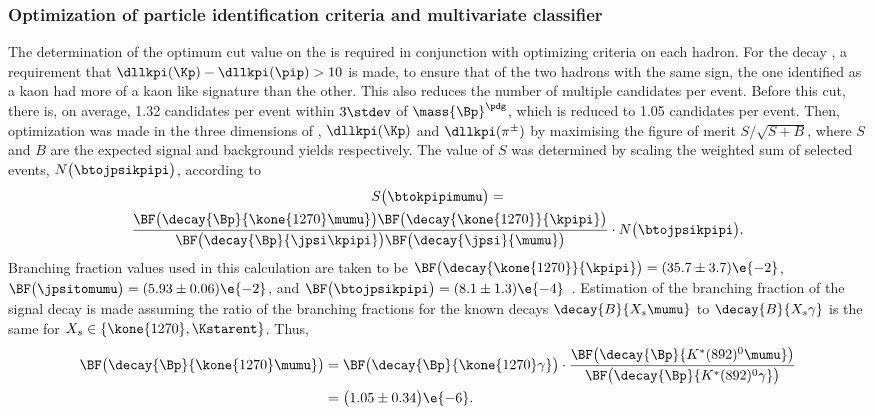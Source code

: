\subsubsection{Optimization of particle identification criteria and multivariate classifier}
\label{sssec:opt:kpipi}
The determination of the optimum cut value on the \BDT is required in conjunction with optimizing
\pid criteria on each hadron.
For the decay \btokpipimumu, a requirement that $\dllkpi(\Kp)-\dllkpi(\pip)>10$ is made, to
ensure that of the two hadrons with the same sign, the one identified as a kaon had more of
a kaon like signature than the other.
This also reduces the number of multiple candidates per event.
Before this cut, there is, on average, 1.32 candidates per event within $3\stdev$ of
$\mass{\Bp}^{\pdg}$, which is reduced to 1.05 candidates per event.
Then, optimization was made in the three dimensions of \BDT, $\dllkpi(\Kp)$ and $\dllkpi(\pi^\pm)$
by maximising the figure of merit $S/\sqrt{S+B}$, where $S$ and $B$ are the expected signal and
background yields respectively.
The value of $S$ was determined by scaling the weighted sum of selected \btojpsikpipi events,
$N\big(\btojpsikpipi\big)$, according to
\begin{multline}
  S\big(\btokpipimumu\big) = \\
  \frac{
    \BF\big(\decay{\Bp}{\kone{1270}\mumu}\big)
    \BF\big(\decay{\kone{1270}}{\kpipi}\big)
  }{
    \BF\big(\decay{\Bp}{\jpsi\kpipi}\big)
    \BF\big(\decay{\jpsi}{\mumu}\big)
  }
  \cdot
  N\big(\btojpsikpipi\big).
\end{multline}
Branching fraction values used in this calculation are taken to be
$\BF\big(\decay{\kone{1270}}{\kpipi}\big) = (35.7\pm3.7)\e{-2}$,
$\BF\big(\jpsitomumu\big) = (5.93\pm0.06)\e{-2}$, and
$\BF\big(\btojpsikpipi\big) = (8.1\pm1.3)\e{-4}$~\cite{PDG2012}.
Estimation of the branching fraction of the signal decay  is made
assuming the ratio of the branching fractions for the known decays $\decay{B}{X_s\mumu}$ to
$\decay{B}{X_s\gamma}$
is the same for $X_s\in\{\kone{1270},\Kstarent\}$.
Thus,
\begin{align}
  \BF\big(\decay{\Bp}{\kone{1270}\mumu}\big)
  &=
  \BF\big(\decay{\Bp}{\kone{1270}\gamma}\big)
  \cdot\frac{
    \BF\big(\decay{\Bp}{K^*(892)^0\mumu}\big)
  }{
  \BF\big(\decay{\Bp}{K^*(892)^0\gamma}\big)
  }\nonumber\\
  &=\big(1.05\pm0.34\big)\e{-6}.
\end{align}

